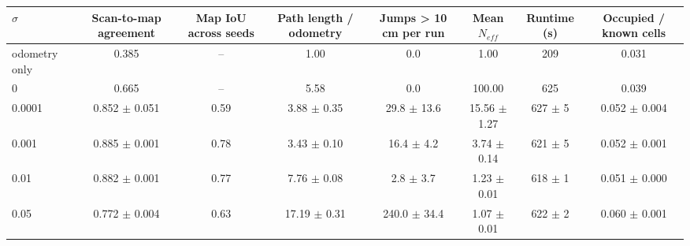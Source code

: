\begin{tabular}{lccccccc}
\toprule
$\sigma$ & Scan-to-map agreement & Map IoU across seeds & Path length / odometry & Jumps > 10 cm per run & Mean $N_{eff}$ & Runtime (s) & Occupied / known cells \\
\midrule
odometry only & 0.385 & -- & 1.00 & 0.0 & 1.00 & 209 & 0.031 \\
0 & 0.665 & -- & 5.58 & 0.0 & 100.00 & 625 & 0.039 \\
0.0001 & 0.852 $\pm$ 0.051 & 0.59 & 3.88 $\pm$ 0.35 & 29.8 $\pm$ 13.6 & 15.56 $\pm$ 1.27 & 627 $\pm$ 5 & 0.052 $\pm$ 0.004 \\
0.001 & 0.885 $\pm$ 0.001 & 0.78 & 3.43 $\pm$ 0.10 & 16.4 $\pm$ 4.2 & 3.74 $\pm$ 0.14 & 621 $\pm$ 5 & 0.052 $\pm$ 0.001 \\
0.01 & 0.882 $\pm$ 0.001 & 0.77 & 7.76 $\pm$ 0.08 & 2.8 $\pm$ 3.7 & 1.23 $\pm$ 0.01 & 618 $\pm$ 1 & 0.051 $\pm$ 0.000 \\
0.05 & 0.772 $\pm$ 0.004 & 0.63 & 17.19 $\pm$ 0.31 & 240.0 $\pm$ 34.4 & 1.07 $\pm$ 0.01 & 622 $\pm$ 2 & 0.060 $\pm$ 0.001 \\
\bottomrule
\end{tabular}
